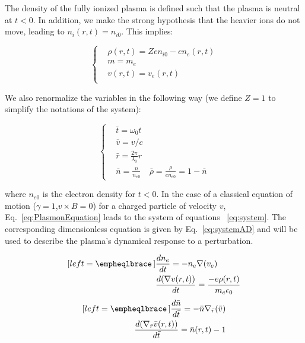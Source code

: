 \noindent The density of the fully ionized plasma is defined such that the plasma is neutral at $t < 0$. In addition, we make the strong hypothesis that the heavier ions do not move, leading to $n_i(r,t) = n_{i0}$. This implies:


\begin{equation}
  \left\{
      \begin{aligned}
     &\rho(r,t) = Z e n_{i0} - e  n_e(r,t)\\
     &m = m_e\\
    &v(r,t) = v_e(r,t)\\
      \end{aligned}
    \right.
\label{eq:Parameters}
\end{equation}

\noindent We also renormalize the variables in the following way (we define $Z=1$ to simplify the notations of the system):

\begin{equation}
  \left\{
      \begin{aligned}
     &\bar{t} = \omega_0 t\\
     &\bar{v} = v/c\\
     &\bar{r} = \frac{2\pi}{\lambda_0 }r\\  
     & \bar{n} = \frac{n}{n_{e0}} 
     & \bar{\rho} = \frac{\rho}{e n_{e0}} = 1 - \bar{n}
      \end{aligned}
    \right.
\end{equation}

\noindent where $n_{e0}$ is the electron density for $t<0$.
In the case of a classical equation of motion ($\gamma = 1$,$v\times B = 0$) for a charged particle of velocity $v$, Eq.~\ref{eq:PlasmonEquation} leads to the system of equations 
~\ref{eq:system}. The corresponding dimensionless equation is given by Eq.~\ref{eq:systemAD} and will be used to describe the plasma's dynamical response to a perturbation.



\begin{multicols}{2}

\begin{subequations}
\label{eq:system}
\begin{align}[left = \empheqlbrace\,]
  &\frac{d n_e}{dt} = - n_e\nabla(v_e)  \label{eq:system1}\\
  &\frac{d( \nabla v(r,t))}{dt} = \frac{-e \rho(r,t)}{m_e \epsilon_0} \label{eq:system2}
\end{align}
\end{subequations}
\begin{subequations}
\label{eq:systemAD}
\begin{align}[left = \empheqlbrace\,]
   \frac{d \bar{n}}{d\bar{t}} = - \bar{n}\nabla_{\bar{r}}(\bar{v})   \label{eq:systemAD1}\\
   \frac{d( \nabla_{\bar{r}} \bar{v}(r,t))}{d\bar{t}} =  \bar{n}(r,t)-1 \label{eq:systemAD2}
\end{align}
\end{subequations}
\end{multicols}






